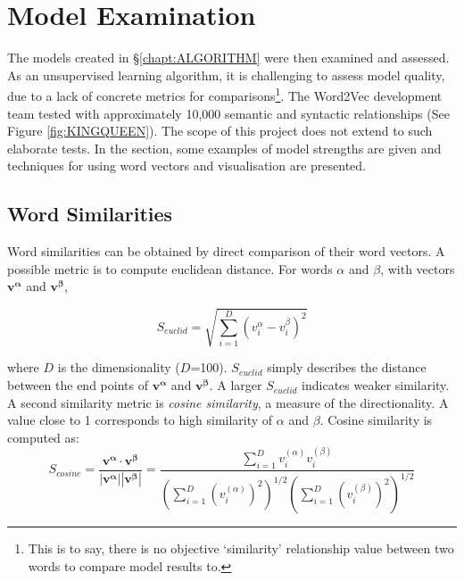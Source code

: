 \chapter{Model Examination}
\addtocounter{page}{1}
\label{chapt:VALIDATION}
The models created in \S\ref{chapt:ALGORITHM} were then examined and assessed. As an unsupervised learning algorithm, it is challenging to assess model quality, due to a lack of concrete metrics for comparisons\footnote{This is to say, there is no objective `similarity' relationship value between two words to compare model results to.}. The Word2Vec development team tested with approximately 10,000 semantic and syntactic relationships (See Figure \ref{fig:KINGQUEEN})\cite{word2vec1}\cite{word2vec2}\cite{word2veckingqueen}. The scope of this project does not extend to such elaborate tests. In the section, some examples of model strengths are given and techniques for using word vectors and visualisation are presented. 
\section{Word Similarities}
Word similarities can be obtained by direct comparison of their word vectors. A possible metric is to compute euclidean distance.  For words $\alpha$ and $\beta$, with vectors $\mathbf{v^\alpha}$ and $\mathbf{v^\beta}$, 

$$S_{euclid} = \sqrt{\sum_{i=1}^{D}(v_i^{\alpha}-v_i^{\beta})^{2}} $$

where $D$ is the dimensionality ($D$=100). $S_{euclid}$ simply describes the distance between the end points of $\mathbf{v^\alpha}$ and $\mathbf{v^\beta}$. A larger $S_{euclid}$ indicates weaker similarity. A second similarity metric is \emph{cosine similarity}, a measure of the directionality. A value close to 1 corresponds to high similarity of $\alpha$ and $\beta$. Cosine similarity is computed as:
$$S_{cosine}=\frac{\mathbf{v^\alpha} \cdot \mathbf{v^\beta}}{|\mathbf{v^\alpha}| |\mathbf{v^\beta}|} = \frac{\displaystyle\sum_{i=1}^{D} v^{(\alpha)}_{i}v^{(\beta)}_{i}}{\left(\displaystyle\sum_{i=1}^{D} (v^{(\alpha)}_{i})^2\right)^{1/2} \left(\displaystyle\sum_{i=1}^{D} (v^{(\beta)}_{i})^2\right)^{1/2}}
$$
\newpage


